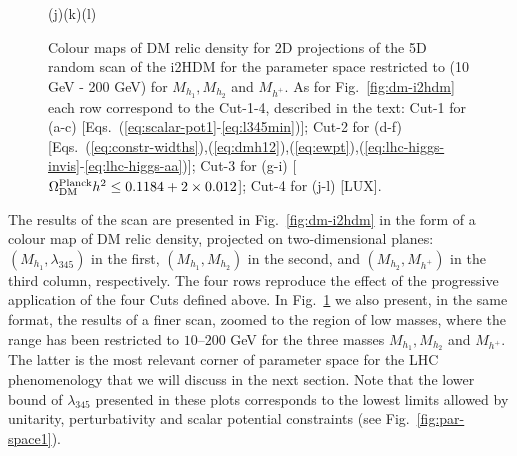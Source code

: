 \documentclass[12pt,a4paper]{article}
\begin{document}
\begin{figure}[htb]
\vskip 0.2cm
\hspace*{1.4cm}(j)\hspace*{0.35\textwidth}\hspace*{-1.5cm}(k)\hspace*{0.35\textwidth}\hspace*{-1.6cm}(l)
\caption{Colour maps of DM relic density for 2D projections of the 5D random scan of the
i2HDM for the parameter space restricted to (10 GeV - 200 GeV) for $M_{h_1},M_{h_2}$ and
$M_{h^{+}}$. As for Fig.~\ref{fig:dm-i2hdm} each row correspond to the Cut-1-4, described in the text: Cut-1 for (a-c) [Eqs.~(\ref{eq:scalar-pot1}-\ref{eq:l345min})]; Cut-2 for (d-f) [Eqs.~(\ref{eq:constr-widths}),(\ref{eq:dmh12}),(\ref{eq:ewpt}),(\ref{eq:lhc-higgs-invis}-\ref{eq:lhc-higgs-aa})]; Cut-3 for (g-i) [$\Omega_{\rm DM}^{\rm Planck} h^2 \le 0.1184+2\times 0.012$]; Cut-4 for (j-l) [LUX].\label{fig:dm-i2hdm-small}}
\end{figure}

The results of the  scan are  presented in Fig.~\ref{fig:dm-i2hdm} in the form of a colour map of
DM relic density, projected on two-dimensional planes: $(M_{h_1},\lambda_{345})$ in the first,
$(M_{h_1},M_{h_2})$ in the second, and $(M_{h_2},M_{h^{+}})$ in the third column, respectively.
The four rows reproduce the effect of the progressive application of the four Cuts defined above.
In Fig.~\ref{fig:dm-i2hdm-small} we also present, in the same format, the results of a finer scan, zoomed to the region of low masses, where the range has been restricted to $10$--$200$ GeV for the three masses $M_{h_1},M_{h_2}$ and $M_{h^{+}}$. The latter is the most relevant corner of parameter space for the LHC phenomenology that we will discuss in the next section. Note that the lower bound of $\lambda_{345}$ presented in these plots corresponds to the lowest limits allowed by unitarity, perturbativity and scalar potential constraints (see Fig.~\ref{fig:par-space1}).
\end{document}
